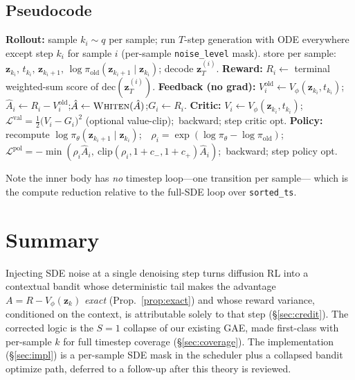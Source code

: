 \documentclass[11pt]{article}
\theoremstyle{plain}
\theoremstyle{remark}
\newcommand{\zt}{\bm{z}}
\newcommand{\Vphi}{V_\phi}
\begin{document}
\subsection{Pseudocode}

\begin{algorithm}[H]
\caption{Per-sample single-step SDE PPO (one optimize round)}
\label{alg:single-sde}
\begin{algorithmic}[1]
\State \textbf{Rollout:} sample $k_i\sim q$ per sample; run $T$-step generation with ODE
       everywhere except step $k_i$ for sample $i$ (per-sample \texttt{noise\_level} mask).
\State \quad store per sample: $\zt_{k_i},\,t_{k_i},\,\zt_{k_i+1},\,
       \log\pi_{\mathrm{old}}(\zt_{k_i+1}\mid\zt_{k_i})$; decode $\zt_T^{(i)}$.
\State \textbf{Reward:} $R_i\gets$ terminal weighted-sum score of $\mathrm{dec}(\zt_T^{(i)})$.
\State \textbf{Feedback (no grad):} $V^{\text{old}}_i\gets \Vphi(\zt_{k_i},t_{k_i})$;\quad
       $\hat A_i\gets R_i-V^{\text{old}}_i$;\quad $\hat A\gets\textsc{Whiten}(\hat A)$;\quad $G_i\gets R_i$.
  \State \textbf{Critic:} $V_i\gets\Vphi(\zt_{k_i},t_{k_i})$;\ \
         $\mathcal L^{\text{val}}=\tfrac12\big(V_i-G_i\big)^2$ (optional value-clip);\ backward; step critic opt.
  \State \textbf{Policy:} recompute $\log\pi_\theta(\zt_{k_i+1}\mid\zt_{k_i})$;\ \
         $\rho_i=\exp(\log\pi_\theta-\log\pi_{\mathrm{old}})$;
  \State \quad $\mathcal L^{\text{pol}}=-\min(\rho_i\hat A_i,\ \mathrm{clip}(\rho_i,1{+}c_-,1{+}c_+)\hat A_i)$;\ backward; step policy opt.
\EndFor
\end{algorithmic}
\end{algorithm}

\noindent Note the inner body has \emph{no} timestep loop---one transition per sample---
which is the compute reduction relative to the full-SDE loop over \texttt{sorted\_ts}.

\section{Summary}
\label{sec:summary}
Injecting SDE noise at a single denoising step turns diffusion RL into a contextual
bandit whose deterministic tail makes the advantage $A=R-\Vphi(\zt_k)$ \emph{exact}
(Prop.~\ref{prop:exact}) and whose reward variance, conditioned on the context, is
attributable solely to that step (\S\ref{sec:credit}). The corrected logic is the
$S{=}1$ collapse of our existing GAE, made first-class with per-sample $k$ for full
timestep coverage (\S\ref{sec:coverage}). The implementation (\S\ref{sec:impl}) is a
per-sample SDE mask in the scheduler plus a collapsed bandit optimize path, deferred to a
follow-up after this theory is reviewed.
\end{document}
